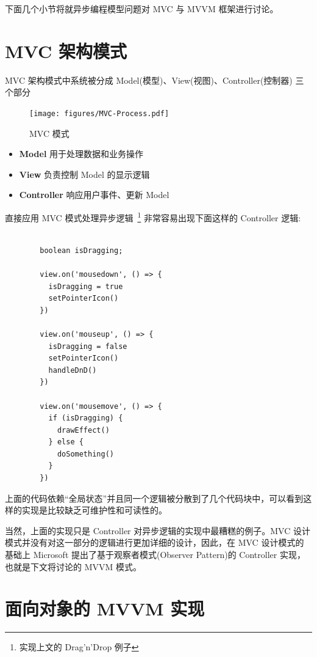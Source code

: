 下面几个小节将就异步编程模型问题对 MVC 与 MVVM 框架进行讨论。

\section{MVC 架构模式}

MVC 架构模式中系统被分成 Model(模型)、View(视图)、Controller(控制器) 三个部分

\begin{figure}[!h]
  \begin{center}
    \texttt{[image: figures/MVC-Process.pdf]}
    \caption{MVC 模式}
  \end{center}
\end{figure}

\begin{itemize}
  \item \textbf{Model} 用于处理数据和业务操作
  \item \textbf{View} 负责控制 Model 的显示逻辑
  \item \textbf{Controller} 响应用户事件、更新 Model
\end{itemize}

直接应用 MVC 模式处理异步逻辑~\footnote{实现上文的 Drag'n'Drop 例子} 非常容易出现下面这样的 Controller 逻辑:

\begin{verbatim}

        boolean isDragging;

        view.on('mousedown', () => {
          isDragging = true
          setPointerIcon()
        })

        view.on('mouseup', () => {
          isDragging = false
          setPointerIcon()
          handleDnD()
        })

        view.on('mousemove', () => {
          if (isDragging) {
            drawEffect()
          } else {
            doSomething()
          }
        })

\end{verbatim}

上面的代码依赖“全局状态”并且同一个逻辑被分散到了几个代码块中，可以看到这样的实现是比较缺乏可维护性和可读性的。

当然，上面的实现只是 Controller 对异步逻辑的实现中最糟糕的例子。MVC 设计模式并没有对这一部分的逻辑进行更加详细的设计，因此，在 MVC 设计模式的基础上 Microsoft 提出了基于观察者模式(Observer Pattern)的 Controller 实现，也就是下文将讨论的 MVVM 模式。

\section{面向对象的 MVVM 实现}

